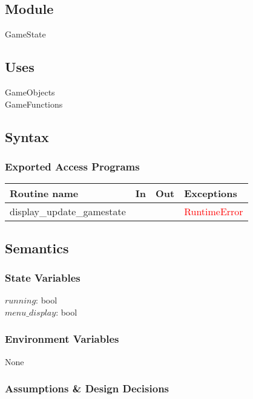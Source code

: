 \documentclass[12pt, titlepage]{article}
\begin{document}
\subsection*{Module}

GameState

\subsection* {Uses}

\noindent GameObjects\\
\noindent GameFunctions

\subsection* {Syntax}

\subsubsection* {Exported Access Programs}

\begin{tabular}{| l | l | l | l |}
\hline
\textbf{Routine name} & \textbf{In} & \textbf{Out} & \textbf{Exceptions}\\
\hline
display\_update\_gamestate & & & \textcolor{red}{RuntimeError}\\
\hline
\end{tabular}

\subsection* {Semantics}

\subsubsection* {State Variables}

$running$: bool\\
$menu\_display$: bool\\

\subsubsection* {Environment Variables}

None

\subsubsection* {Assumptions \& Design Decisions}
\end{document}
